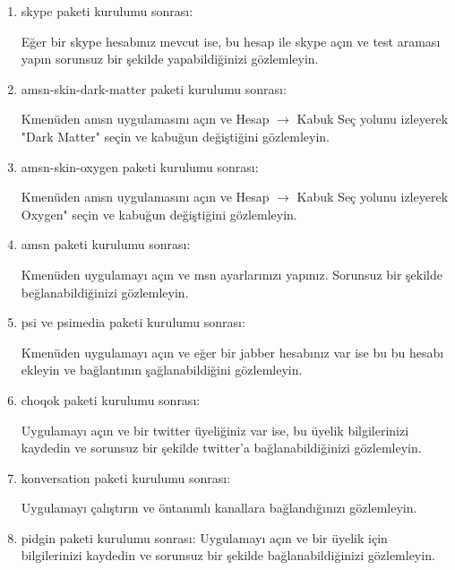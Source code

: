 \documentclass[a4paper,10pt]{article}
\begin{document}
\begin{enumerate}
\item skype paketi kurulumu sonrası:

Eğer bir skype hesabınız mevcut ise, bu hesap ile skype açın ve test araması yapın sorunsuz bir şekilde yapabildiğinizi gözlemleyin.
\item amsn-skin-dark-matter paketi kurulumu sonrası:

Kmenüden amsn uygulamasını açın ve Hesap $\rightarrow$ Kabuk Seç yolunu izleyerek "Dark Matter" seçin ve kabuğun değiştiğini gözlemleyin.

\item amsn-skin-oxygen paketi kurulumu sonrası:

Kmenüden amsn uygulamasını açın ve Hesap $\rightarrow$ Kabuk Seç yolunu izleyerek Oxygen" seçin ve kabuğun değiştiğini gözlemleyin.

\item amsn paketi kurulumu sonrası:

Kmenüden uygulamayı açın ve msn ayarlarınızı yapınız. Sorunsuz bir şekilde beğlanabildiğinizi gözlemleyin.

\item psi ve psimedia paketi kurulumu sonrası:

Kmenüden uygulamayı açın ve eğer bir jabber hesabınız var ise bu bu hesabı ekleyin ve bağlantının şağlanabildiğini gözlemleyin.

\item choqok paketi kurulumu sonrası:

Uygulamayı açın ve bir twitter üyeliğiniz var ise, bu üyelik bilgilerinizi kaydedin ve sorunsuz bir şekilde twitter'a bağlanabildiğinizi gözlemleyin.	
\item konversation paketi kurulumu sonrası:

Uygulamayı çalıştırın ve öntanımlı kanallara bağlandığınızı gözlemleyin.

\item pidgin paketi kurulumu sonrası:
Uygulamayı açın ve bir üyelik için bilgilerinizi kaydedin ve sorunsuz bir şekilde bağlanabildiğinizi gözlemleyin.

\end{enumerate}
\end{document}
